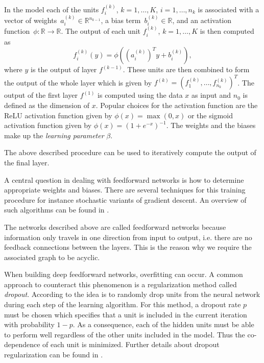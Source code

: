 \documentclass[12pt, a4paper]{scrartcl}
\theoremstyle{definition}
\theoremstyle{plain}
\numberwithin{equation}{section}
\numberwithin{figure}{section}
\numberwithin{table}{section}
\begin{document}
	In the model each of the units $f^{(k)}_i$, $k=1,\dots,K$, $i = 1,\dots,n_{k}$ is associated with a vector of weights~$a^{(k)}_i \in \mathbb{R}^{n_{k-1}}$, a bias term~$b^{(k)}_i\in \mathbb{R}$, and an activation function~$\phi: \mathbb{R} \to \mathbb{R}$.
	The output of each unit $f^{(k)}_i$, $k=1,\dots,K$ is then computed as
	\begin{equation*}
	f_i^{(k)}(y) = \phi \left(\left(a^{(k)}_i\right)^Ty + b^{(k)}_i\right),
	\end{equation*}
	where $y$ is the output of layer $f^{(k-1)}$.
	These units are then combined to form the output of the whole layer which is given by $f^{(k)} = \left(f^{(k)}_1,\dots, f^{(k)}_{n_k}\right)^T$.
	The output of the first layer $f^{(1)}$ is computed using the data $x$ as input and $n_0$ is defined as the dimension of $x$.
	Popular choices for the activation function are the ReLU activation function given by $\phi(x) = \max(0,x)$ or the sigmoid activation function given by $\phi(x) = (1+e^{-x})^{-1}$.
	The weights and the biases make up the \emph{learning parameter} $\beta$.
	
	The above described procedure can be used to iteratively compute the output of the final layer.
	
	A central question in dealing with feedforward networks is how to determine appropriate weights and biases.
	There are several techniques for this training procedure for instance stochastic variants of gradient descent.
	An overview of such algorithms can be found in \citet*[Chapter~5]{deeplbook}.
	
	The networks described above are called feedforward networks because information only travels in one direction from input to output, i.e. there are no feedback connections between the layers.
	This is the reason why we require the associated graph to be acyclic.
	
	When building deep feedforward networks, overfitting can occur.
	A common approach to counteract this phenomenon is a regularization method called \emph{dropout}.
	According to \citet*{dropout} the idea is to randomly drop units from the neural network during each step of the learning algorithm.
	For this method, a dropout rate $p$ must be chosen which specifies that a unit is included in the current iteration with probability $1-p$.
	As a consequence, each of the hidden units must be able to perform well regardless of the other units included in the model.
	Thus the co-dependence of each unit is minimized.
	Further details about dropout regularization can be found in \citet*{dropout}.
	
\end{document}
